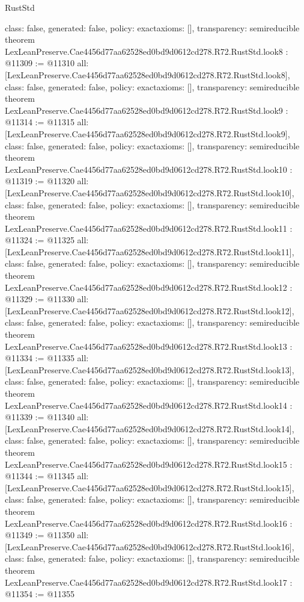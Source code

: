 \begin{lexlean}{RustStd}
\begin{coremodule}
{  class: false,
  generated: false,
  policy: exact{axioms: []},
  transparency: semireducible
}
theorem LexLeanPreserve.Cae4456d77aa62528ed0bd9d0612cd278.R72.RustStd.look8 : @11309 := @11310 {
  all: [LexLeanPreserve.Cae4456d77aa62528ed0bd9d0612cd278.R72.RustStd.look8],
  class: false,
  generated: false,
  policy: exact{axioms: []},
  transparency: semireducible
}
theorem LexLeanPreserve.Cae4456d77aa62528ed0bd9d0612cd278.R72.RustStd.look9 : @11314 := @11315 {
  all: [LexLeanPreserve.Cae4456d77aa62528ed0bd9d0612cd278.R72.RustStd.look9],
  class: false,
  generated: false,
  policy: exact{axioms: []},
  transparency: semireducible
}
theorem LexLeanPreserve.Cae4456d77aa62528ed0bd9d0612cd278.R72.RustStd.look10 : @11319 := @11320 {
  all: [LexLeanPreserve.Cae4456d77aa62528ed0bd9d0612cd278.R72.RustStd.look10],
  class: false,
  generated: false,
  policy: exact{axioms: []},
  transparency: semireducible
}
theorem LexLeanPreserve.Cae4456d77aa62528ed0bd9d0612cd278.R72.RustStd.look11 : @11324 := @11325 {
  all: [LexLeanPreserve.Cae4456d77aa62528ed0bd9d0612cd278.R72.RustStd.look11],
  class: false,
  generated: false,
  policy: exact{axioms: []},
  transparency: semireducible
}
theorem LexLeanPreserve.Cae4456d77aa62528ed0bd9d0612cd278.R72.RustStd.look12 : @11329 := @11330 {
  all: [LexLeanPreserve.Cae4456d77aa62528ed0bd9d0612cd278.R72.RustStd.look12],
  class: false,
  generated: false,
  policy: exact{axioms: []},
  transparency: semireducible
}
theorem LexLeanPreserve.Cae4456d77aa62528ed0bd9d0612cd278.R72.RustStd.look13 : @11334 := @11335 {
  all: [LexLeanPreserve.Cae4456d77aa62528ed0bd9d0612cd278.R72.RustStd.look13],
  class: false,
  generated: false,
  policy: exact{axioms: []},
  transparency: semireducible
}
theorem LexLeanPreserve.Cae4456d77aa62528ed0bd9d0612cd278.R72.RustStd.look14 : @11339 := @11340 {
  all: [LexLeanPreserve.Cae4456d77aa62528ed0bd9d0612cd278.R72.RustStd.look14],
  class: false,
  generated: false,
  policy: exact{axioms: []},
  transparency: semireducible
}
theorem LexLeanPreserve.Cae4456d77aa62528ed0bd9d0612cd278.R72.RustStd.look15 : @11344 := @11345 {
  all: [LexLeanPreserve.Cae4456d77aa62528ed0bd9d0612cd278.R72.RustStd.look15],
  class: false,
  generated: false,
  policy: exact{axioms: []},
  transparency: semireducible
}
theorem LexLeanPreserve.Cae4456d77aa62528ed0bd9d0612cd278.R72.RustStd.look16 : @11349 := @11350 {
  all: [LexLeanPreserve.Cae4456d77aa62528ed0bd9d0612cd278.R72.RustStd.look16],
  class: false,
  generated: false,
  policy: exact{axioms: []},
  transparency: semireducible
}
theorem LexLeanPreserve.Cae4456d77aa62528ed0bd9d0612cd278.R72.RustStd.look17 : @11354 := @11355 {
}
\end{coremodule}
\end{lexlean}
